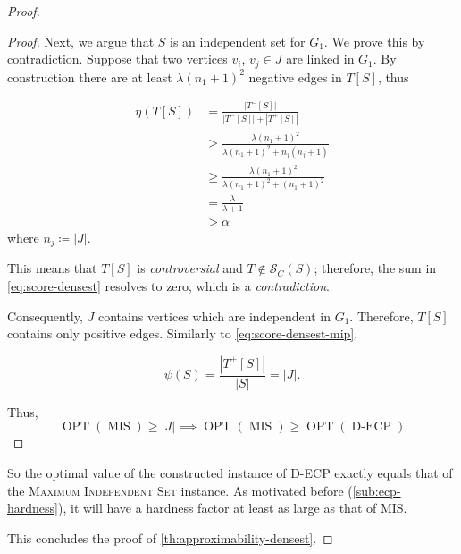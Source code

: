 \begin{proof}
\begin{proof}
		Next, we argue that $S$ is an independent set for $G_1$. We prove this by
		contradiction. Suppose
		that two vertices $v_{i} $, $v_{j} \in J$ are linked in $G_1$.
		By construction there are at least $\lambda (n_1 + 1)^{2} $ negative edges in
		$T[S]$, thus

		\begin{align*}
			\eta(T[S]) & = \frac{|T^{-}[S]|}{|T^{-}[S]| + |T^{+}[S]|}      \\
			           & \geq \frac{\lambda (n_1+1)^2}{\lambda (n_1+1)^2 +
				n_j(n_j+1)}
			\\ & \geq \frac{\lambda (n_1+1)^{2} }{\lambda (n_1+1)^2 + (n_1+1)^2}
			\\ & = \frac{\lambda }{\lambda + 1}
			\\ & > \alpha
		\end{align*}
		where $n_{j} \coloneqq |J|$.


		This means that $T[S]$ is \emph{controversial} and $T \not\in
			\mathcal{S}_C(S) $; therefore, the sum in \eqref{eq:score-densest} resolves to
		zero, which is a \emph{contradiction}.

		Consequently, $J$ contains vertices which are independent in $G_1$.
		Therefore, $T[S]$ contains only positive edges. Similarly to
		\eqref{eq:score-densest-mip},

		\begin{equation}
			\psi(S) = \frac{|T^{+}[S]|}{|S|} = |J|.
		\end{equation}

		Thus,
		\begin{equation}
			\operatorname{OPT}(\operatorname{MIS}) \geq |J| \implies
			\operatorname{OPT}(\operatorname{MIS}) \geq
			\operatorname{OPT}(\operatorname{D-ECP})
		\end{equation}

	\end{proof}
	So the optimal value of the constructed instance of \acrshort{D-ECP}
	exactly equals that of the \textsc{Maximum Independent Set} instance.
	As motivated before (\autoref{sub:ecp-hardness}), it will have a hardness factor at least as large as that of MIS.

	This concludes the proof of \autoref{th:approximability-densest}.
\end{proof}
